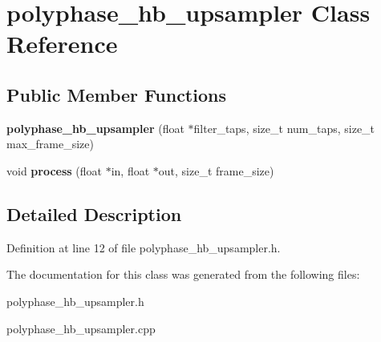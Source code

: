 \hypertarget{classpolyphase__hb__upsampler}{}\section{polyphase\+\_\+hb\+\_\+upsampler Class Reference}
\label{classpolyphase__hb__upsampler}
\subsection*{Public Member Functions}
\begin{DoxyCompactItemize}
\item 
\mbox{\label{classpolyphase__hb__upsampler_ac703c7fd2eca07a979ba46f732e8133f}} 
{\bfseries polyphase\+\_\+hb\+\_\+upsampler} (float $\ast$filter\+\_\+taps, size\+\_\+t num\+\_\+taps, size\+\_\+t max\+\_\+frame\+\_\+size)
\item 
\mbox{\label{classpolyphase__hb__upsampler_a97fdd44f1c426eed9671146274a29b56}} 
void {\bfseries process} (float $\ast$in, float $\ast$out, size\+\_\+t frame\+\_\+size)
\end{DoxyCompactItemize}


\subsection{Detailed Description}


Definition at line 12 of file polyphase\+\_\+hb\+\_\+upsampler.\+h.



The documentation for this class was generated from the following files\+:\begin{DoxyCompactItemize}
\item 
polyphase\+\_\+hb\+\_\+upsampler.\+h\item 
polyphase\+\_\+hb\+\_\+upsampler.\+cpp\end{DoxyCompactItemize}
